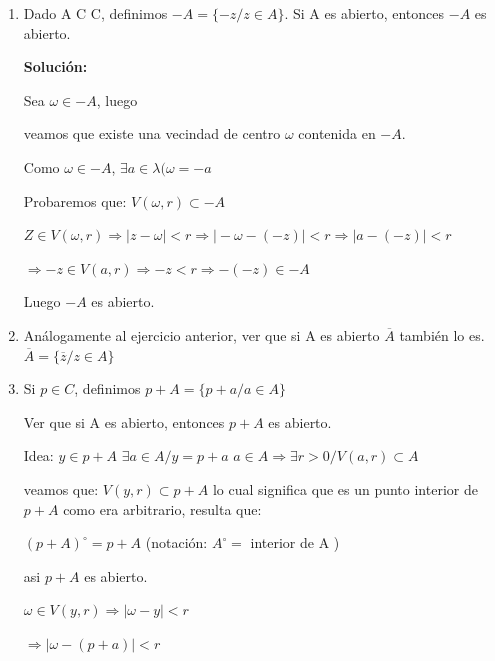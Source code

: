 \documentclass[a4paper,12pt]{article}
\begin{document}
\begin{enumerate}
\[
\left[ z_1^2 - \text{Re}(z_1)(z_1 - \overline{z}_1) - z_1 \overline{z}_1 - 2 \text{Im}(z_1) \text{Im}(\overline{z}_1) \right] z + |z| - |2(1 + \mathrm{i})| = 0
\]


Puede apreciarse que el corchete es cero, así tendremos que
\[
| z | = 2 \sqrt{2}
\]

O sea, los puntos sobre el disco de centro en el origen y radio 2 $\sqrt{2}$ son los z
buscados.



    \item Dado A C C, definimos \(-A = \{ -z / z \in A \}\).
Si A es abierto, entonces \(-A\) es abierto.

\textbf{Solución:}

Sea \(\omega \in -A\), luego

veamos que existe una vecindad de centro \(\omega\) contenida en \(-A\).

Como \(\omega \in -A\), \(\exists a \in \lambda (\omega = -a\)

Probaremos que: \(V(\omega, r) \subset -A\)

\(Z \in V(\omega, r) \Rightarrow \mid z - \omega \mid < r \Rightarrow \mid - \omega - (-z) \mid < r \Rightarrow \mid a - (-z) \mid < r\)

\(\Rightarrow -z \in V(a, r) \Rightarrow -z < r \Rightarrow -(-z) \in -A\)

Luego \(-A\) es abierto.

    \item Análogamente al ejercicio anterior, ver que si A es abierto \(\overline{A}\) también lo es.
\(\overline{A} = \{ \overline{z} / z \in A \}\)

    \item Si \(p \in C\), definimos \(p + A = \{ p + a / a \in A \}\)

Ver que si A es abierto, entonces \(p + A\) es abierto.

Idea: \(y \in p + A\)
\(\exists a \in A / y = p + a\)
\(a \in A \Rightarrow \exists r > 0 / V(a, r) \subset A\)

veamos que: \(V(y, r) \subset p + A\) lo cual significa que es un punto interior de
\(p + A\) como era arbitrario, resulta que:

\(( p + A )^\circ = p + A\) (notación: \(A^\circ =\) interior de A )

asi \(p + A\) es abierto.

\(\omega \in V(y, r) \Rightarrow \mid \omega - y \mid < r\)

\(\Rightarrow \mid \omega - (p + a) \mid < r\)


\end{enumerate}
\end{document}
